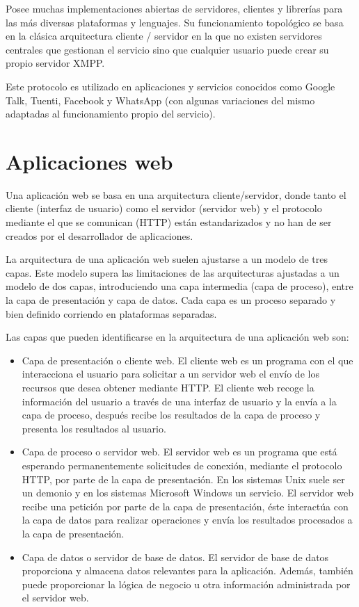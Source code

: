 Posee muchas implementaciones abiertas de servidores, clientes y librerías para las más diversas plataformas y lenguajes. Su funcionamiento topológico se basa en la clásica arquitectura cliente / servidor en la que no existen servidores centrales que gestionan el servicio sino que cualquier usuario puede crear su propio servidor XMPP.

Este protocolo es utilizado en aplicaciones y servicios conocidos como Google Talk, Tuenti, Facebook y WhatsApp (con algunas variaciones del mismo adaptadas al funcionamiento propio del servicio).

\section{Aplicaciones web}

Una aplicación web se basa en una arquitectura cliente/servidor, donde tanto el cliente (interfaz de usuario) como el servidor (servidor web) y el protocolo mediante el que se comunican (HTTP) están estandarizados y no han de ser creados por el desarrollador de aplicaciones.

La arquitectura de una aplicación web suelen ajustarse a un modelo de tres capas. Este modelo supera las limitaciones de las arquitecturas ajustadas a un modelo de dos capas, introduciendo una capa intermedia (capa de proceso), entre la capa de presentación y  capa de datos. Cada capa es un proceso separado y bien definido corriendo en plataformas separadas.

Las capas que pueden identificarse en la arquitectura de una aplicación web son:

\begin{itemize}
  \item Capa de presentación o cliente web. El cliente web es un programa con el que interacciona el usuario para solicitar a un servidor web el envío de los recursos que desea obtener mediante HTTP. El cliente web recoge la información del usuario a través de una interfaz de usuario y la envía a la capa de proceso, después recibe los resultados de la capa de proceso y presenta los resultados al usuario.
  \item Capa de proceso o servidor web. El servidor web es un programa que está esperando permanentemente solicitudes de conexión, mediante el protocolo HTTP, por parte de la capa de presentación. En los sistemas Unix suele ser un demonio y en los sistemas Microsoft Windows un servicio. El servidor web recibe una petición por parte de la capa de presentación, éste interactúa con la capa de datos para realizar operaciones y envía los resultados procesados a la capa de presentación.
  \item Capa de datos o servidor de base de datos. El servidor de base de datos proporciona y almacena datos relevantes para la aplicación. Además, también puede proporcionar la lógica de negocio u otra información administrada por el servidor web.
\end{itemize}

